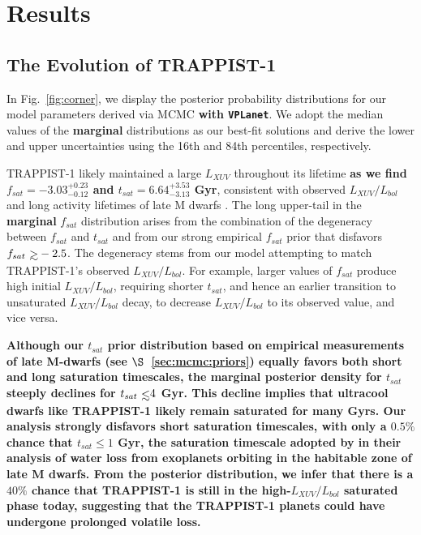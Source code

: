\documentclass[twocolumn]{aastex62}
\def\gsim{~\rlap{$>$}{\lower 1.0ex\hbox{$\sim$}}}
\def\lsim{~\rlap{$<$}{\lower 1.0ex\hbox{$\sim$}}}
\newcommand{\xxx}[1]{{\textbf{#1}}}
\newcommand{\vplanet}[0]{\texttt{VPLanet}\xspace}
\begin{document}

\section{Results} \label{sec:results}

\subsection{The Evolution of TRAPPIST-1}

In Fig.~\ref{fig:corner}, we display the posterior probability distributions for our model parameters derived via MCMC \xxx{with \vplanet}. We adopt the median values of the \xxx{marginal} distributions as our best-fit solutions and derive the lower and upper uncertainties using the 16th and 84th percentiles, respectively. 

TRAPPIST-1 likely maintained a large $L_{XUV}$ throughout its lifetime \xxx{as we find $f_{sat} = -3.03^{+0.23}_{-0.12}$ and $t_{sat} = 6.64^{+3.53}_{-3.13}$ Gyr}, consistent with observed $L_{XUV}/L_{bol}$ and long activity lifetimes of late M dwarfs \citep{West2008,Wright2018}. The long upper-tail in the \xxx{marginal} $f_{sat}$ distribution arises from the combination of the degeneracy between $f_{sat}$ and $t_{sat}$ and from our strong empirical $f_{sat}$ prior that disfavors $f_{sat} \gsim -2.5$. The degeneracy stems from our model attempting to match TRAPPIST-1's observed \xxx{$L_{XUV}/L_{bol}$}. For example, larger values of $f_{sat}$ produce high initial \xxx{$L_{XUV}/L_{bol}$}, requiring shorter $t_{sat}$, and hence an earlier transition to unsaturated \xxx{$L_{XUV}/L_{bol}$} decay, to decrease \xxx{$L_{XUV}/L_{bol}$} to its observed value, and vice versa. 

\xxx{Although our $t_{sat}$ prior distribution based on empirical measurements of late M-dwarfs (see $\S$~\ref{sec:mcmc:priors}) equally favors both short and long saturation timescales, the marginal posterior density for $t_{sat}$ steeply declines for $t_{sat} \lsim 4$ Gyr. This decline implies that ultracool dwarfs like TRAPPIST-1 likely remain saturated for many Gyrs. Our analysis strongly disfavors short saturation timescales, with only a $0.5\%$ chance that $t_{sat} \leq 1$ Gyr, the saturation timescale adopted by \citet{Luger2015} in their analysis of water loss from exoplanets orbiting in the habitable zone of late M dwarfs. From the posterior distribution, we infer that there is a $40\%$ chance that TRAPPIST-1 is still in the high-$L_{XUV}/L_{bol}$ saturated phase today, suggesting that the TRAPPIST-1 planets could have undergone prolonged volatile loss.}
\end{document}
